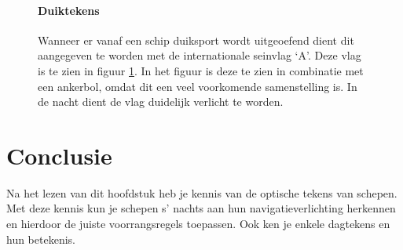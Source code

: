 \begin{figure}[H]
	\centering
	\begin{minipage}[t]{0.75\textwidth}
		\paragraph{Duiktekens}
		Wanneer er vanaf een schip duiksport wordt uitgeoefend dient dit aangegeven te worden met de internationale seinvlag `A'. Deze vlag is te zien in figuur  \ref{pic:optisch:duik}. In het figuur is deze te zien in combinatie met een ankerbol, omdat dit een veel voorkomende samenstelling is. In de nacht dient de vlag duidelijk verlicht te worden.
	\end{minipage}
	\hfill
	\begin{minipage}[t]{0.22\textwidth}
		\RemoveLine
		\caption{}
		\label{pic:optisch:duik}
	\end{minipage}
\end{figure}

\section{Conclusie}
Na het lezen van dit hoofdstuk heb je kennis van de optische tekens van schepen. Met deze kennis kun je schepen s' nachts aan hun navigatieverlichting herkennen en hierdoor de juiste voorrangsregels toepassen. Ook ken je enkele dagtekens en hun betekenis.